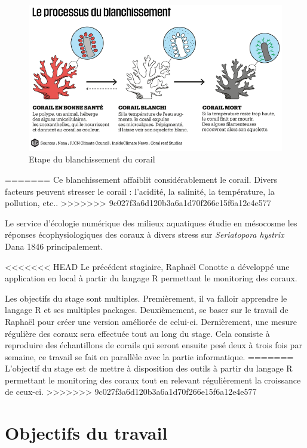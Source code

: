 \documentclass[]{report}
\begin{document}
\begin{figure}
\centering
\includegraphics{../image/blanchissement.png}
\caption{Etape du blanchissement du corail}
\end{figure}
=======
Ce blanchissement affaiblit considérablement le corail. Divers facteurs
peuvent stresser le corail : l'acidité, la salinité, la température, la
pollution, etc..
>>>>>>> 9c027f3a6d120b3a6a1d70f266e15f6a12e4e577

Le service d'écologie numérique des milieux aquatiques étudie en
mésocosme les réponses écophysiologiques des coraux à divers stress sur
\emph{Seriatopora hystrix} Dana 1846 principalement.

<<<<<<< HEAD
Le précédent stagiaire, Raphaël Conotte a développé une application en
local à partir du langage R permettant le monitoring des coraux.

Les objectifs du stage sont multiples. Premièrement, il va falloir
apprendre le langage R et ses multiples packages. Deuxièmement, se baser
sur le travail de Raphaël pour créer une version améliorée de celui-ci.
Dernièrement, une mesure régulière des coraux sera effectuée tout au
long du stage. Cela consiste à reproduire des échantillons de corails
qui seront ensuite pesé deux à trois fois par semaine, ce travail se
fait en parallèle avec la partie informatique.
=======
L'objectif du stage est de mettre à disposition des outils à partir du
langage R permettant le monitoring des coraux tout en relevant
régulièrement la croissance de ceux-ci.
>>>>>>> 9c027f3a6d120b3a6a1d70f266e15f6a12e4e577

\chapter{Objectifs du travail}\label{objectifs-du-travail}
\end{document}
